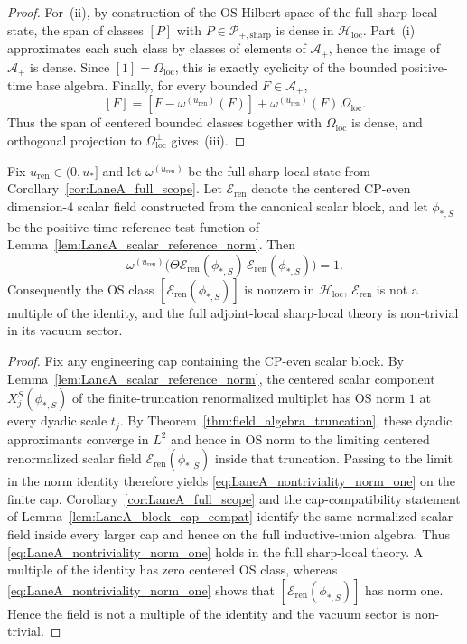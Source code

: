 \begin{proof}
For~(ii), by construction of the OS Hilbert space of the full sharp-local state, the span of classes $[P]$ with $P\in\mathcal P_{+,\mathrm{sharp}}$ is dense in $\mathcal H_{\mathrm{loc}}$.
Part~(i) approximates each such class by classes of elements of $\mathcal A_+$, hence the image of $\mathcal A_+$ is dense.
Since $[1]=\Omega_{\mathrm{loc}}$, this is exactly cyclicity of the bounded positive-time base algebra.
Finally, for every bounded $F\in\mathcal A_+$,
\[
[F]=[F-\omega^{(u_{\mathrm{ren}})}(F)]+\omega^{(u_{\mathrm{ren}})}(F)\,\Omega_{\mathrm{loc}}.
\]
Thus the span of centered bounded classes together with $\Omega_{\mathrm{loc}}$ is dense, and orthogonal projection to $\Omega_{\mathrm{loc}}^\perp$ gives~(iii).
\end{proof}


\begin{theorem}\label{thm:LaneA_nontriviality_witness}
Fix $u_{\mathrm{ren}}\in(0,u_\ast]$ and let $\omega^{(u_{\mathrm{ren}})}$ be the full sharp-local state from Corollary~\ref{cor:LaneA_full_scope}.
Let $\mathcal E_{\mathrm{ren}}$ denote the centered CP-even dimension-$4$ scalar field constructed from the canonical scalar block,
and let $\phi_{\ast,S}$ be the positive-time reference test function of Lemma~\ref{lem:LaneA_scalar_reference_norm}.
Then
\begin{equation}\label{eq:LaneA_nontriviality_norm_one}
\omega^{(u_{\mathrm{ren}})}\big(\Theta\mathcal E_{\mathrm{ren}}(\phi_{\ast,S})\,\mathcal E_{\mathrm{ren}}(\phi_{\ast,S})\big)=1.
\end{equation}
Consequently the OS class $[\mathcal E_{\mathrm{ren}}(\phi_{\ast,S})]$ is nonzero in $\mathcal H_{\mathrm{loc}}$,
$\mathcal E_{\mathrm{ren}}$ is not a multiple of the identity,
and the full adjoint-local sharp-local theory is non-trivial in its vacuum sector.
\end{theorem}

\begin{proof}
Fix any engineering cap containing the CP-even scalar block.
By Lemma~\ref{lem:LaneA_scalar_reference_norm}, the centered scalar component $X^S_j(\phi_{\ast,S})$ of the finite-truncation renormalized multiplet
has OS norm $1$ at every dyadic scale $t_j$.
By Theorem~\ref{thm:field_algebra_truncation}, these dyadic approximants converge in $L^2$ and hence in OS norm to the limiting centered renormalized scalar field
$\mathcal E_{\mathrm{ren}}(\phi_{\ast,S})$ inside that truncation.
Passing to the limit in the norm identity therefore yields \eqref{eq:LaneA_nontriviality_norm_one} on the finite cap.
Corollary~\ref{cor:LaneA_full_scope} and the cap-compatibility statement of Lemma~\ref{lem:LaneA_block_cap_compat}
identify the same normalized scalar field inside every larger cap and hence on the full inductive-union algebra.
Thus \eqref{eq:LaneA_nontriviality_norm_one} holds in the full sharp-local theory.
A multiple of the identity has zero centered OS class, whereas \eqref{eq:LaneA_nontriviality_norm_one} shows that
$[\mathcal E_{\mathrm{ren}}(\phi_{\ast,S})]$ has norm one.
Hence the field is not a multiple of the identity and the vacuum sector is non-trivial.
\end{proof}

